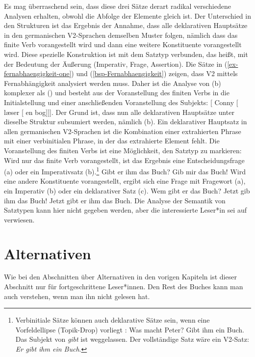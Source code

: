 \noindent
Es mag überraschend sein, dass diese drei Sätze derart radikal verschiedene Analysen erhalten, obwohl die
Abfolge der Elemente gleich ist. Der Unterschied in den Strukturen ist das Ergebnis der Annahme, dass
alle deklarativen Hauptsätze in den germanischen V2-Sprachen demselben Muster folgen, nämlich dass das
finite Verb vorangestellt wird und dann eine weitere Konstituente vorangestellt wird. Diese spezielle Konstruktion ist
mit dem Satztyp verbunden, das heißt, mit der Bedeutung der Äußerung (Imperativ, Frage,
Assertion). Die Sätze in (\ref{ex-fernabhaengigkeit-one}) und (\ref{bsp-Fernabhaengigkeit}) zeigen,
dass V2 mittels Fernabhängigkeit analysiert werden muss. Daher ist die Analyse
von (b) komplexer als () und besteht aus der Voranstellung des finiten Verbs in die
Initialstellung und einer anschließenden Voranstellung des Subjekts:
\ea
{}[ Conny [ læser [ en bog]]].
\z
Der Grund ist, dass nun alle deklarativen Hauptsätze unter dieselbe Struktur subsumiert werden, nämlich
(b). Ein deklarativer Hauptsatz in allen germanischen V2-Sprachen ist die Kombination einer extrahierten
Phrase mit einer verbinitialen Phrase, in der das extrahierte Element fehlt. Die Voranstellung des finiten
Verbs ist eine Möglichkeit, den Satztyp zu markieren: Wird nur das finite Verb vorangestellt, ist das Ergebnis eine Entscheidungsfrage (a)
oder ein Imperativsatz (b).\footnote{
  Verbinitiale Sätze können auch deklarative Sätze sein, wenn eine Vorfeldellipse (Topik-Drop) vorliegt \citep{Fries88b}:
  \ea
  Was macht Peter? Gibt ihm ein Buch.
  \z
  Das Subjekt von \emph{gibt} ist weggelassen. Der vollständige Satz wäre ein V2-Satz:
  \emph{Er gibt ihm ein Buch}.
}
\eal
\ex 
Gibt er ihm das Buch?
\ex 
Gib mir das Buch!
\zl
Wird eine andere Konstituente vorangestellt, ergibt sich eine Frage mit Fragewort (a), ein Imperativ
(b) oder ein deklarativer Satz (c).
\eal
\ex 
Wem gibt er das Buch?
\ex 
Jetzt gib ihm das Buch!
\ex 
Jetzt gibt er ihm das Buch.
\zl
Die Analyse der Semantik von Satztypen kann hier nicht gegeben werden, aber die interessierte Leser*in
sei auf  verwiesen.%

\section{Alternativen}

Wie bei den Abschnitten über Alternativen in den vorigen Kapiteln ist dieser Abschnitt nur für fortgeschrittene
Leser*innen. Den Rest des Buches kann man auch verstehen, wenn man ihn nicht gelesen hat.

